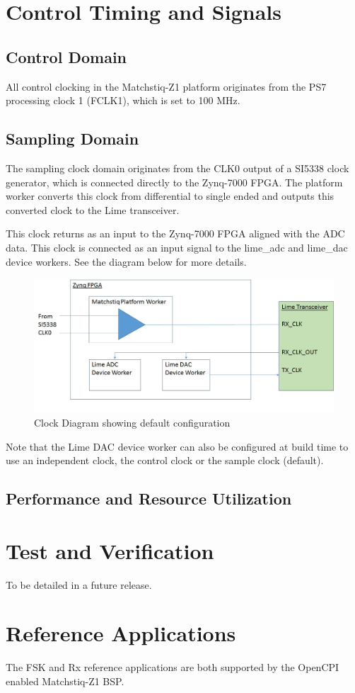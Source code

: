 \documentclass{article}
\edef\ecomp{matchstiq_z1}
\begin{document}
\pagebreak
\section*{Control Timing and Signals}
\subsection*{Control Domain}
All control clocking in the Matchstiq-Z1 platform originates from the PS7 processing clock 1 (FCLK1), which is set to 100 MHz.

\subsection*{Sampling Domain}
The sampling clock domain originates from  the CLK0 output of a SI5338 clock generator, which is connected directly to the Zynq-7000 FPGA. The platform worker converts this clock from differential to single ended and outputs this converted clock to the Lime transceiver.\par\medskip
\noindent This clock returns as an input to the Zynq-7000 FPGA aligned with the ADC data. This clock is connected as an input signal to the lime\_adc and lime\_dac device workers. See the diagram below for more details.\par\medskip
\begin{figure}[ht]
	\centerline{\includegraphics[scale=0.5]{matchstiq_sample_clock_diagram}}
	\caption{Clock Diagram showing default configuration}
	\label{fig:clk}
\end{figure}
\noindent Note that the Lime DAC device worker can also be configured at build time to use an independent clock, the control clock or the sample clock (default).
\newpage

\begin{landscape}
\section*{Performance and Resource Utilization}

\end{landscape}
\section*{Test and Verification}
\begin{flushleft}
 To be detailed in a future release.
\end{flushleft}
\section*{Reference Applications}
The FSK and Rx reference applications are both supported by the OpenCPI enabled Matchstiq-Z1 BSP. 
\end{document}
